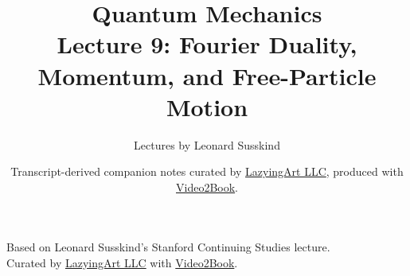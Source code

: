 \documentclass[11pt,oneside]{book}
\begin{document}
\frontmatter
\title{Quantum Mechanics\\Lecture 9: Fourier Duality, Momentum, and Free-Particle Motion}
\author{Lectures by Leonard Susskind}
\date{Transcript-derived companion notes curated by \href{https://lazying.art}{LazyingArt LLC}, produced with \href{https://github.com/lachlanchen/Video2Book}{Video2Book}.}
\maketitle
\setcounter{page}{2}
\begin{center}
\small Based on Leonard Susskind's Stanford Continuing Studies lecture.\\
Curated by \href{https://lazying.art}{LazyingArt LLC} with \href{https://github.com/lachlanchen/Video2Book}{Video2Book}.
\end{center}
\clearpage
\mainmatter

\end{document}
